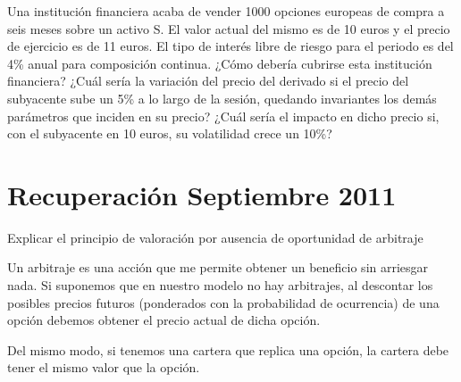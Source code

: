 \begin{problem}[4]
Una institución financiera acaba de vender 1000 opciones europeas de compra a seis meses sobre
un activo S. El valor actual del mismo es de 10 euros y el precio de ejercicio es de 11 euros. El tipo
de interés libre de riesgo para el periodo es del 4\% anual para composición continua.
\ppart ¿Cómo debería cubrirse esta institución financiera?
\ppart ¿Cuál sería la variación del precio del derivado si el precio del subyacente sube un 5\% a lo largo de la sesión, quedando invariantes los demás parámetros que inciden en su precio?
\ppart ¿Cuál sería el impacto en dicho precio si, con el subyacente en 10 euros, su volatilidad crece un 10\%?

\solution

\end{problem}

\section{Recuperación Septiembre 2011}
\begin{problem}[1]
Explicar el principio de valoración por ausencia de oportunidad de arbitraje
\solution


Un arbitraje es una acción que me permite obtener un beneficio sin arriesgar nada. Si suponemos que en nuestro modelo no hay arbitrajes, al descontar los posibles precios futuros (ponderados con la probabilidad de ocurrencia) de una opción debemos obtener el precio actual de dicha opción.

Del mismo modo, si tenemos una cartera que replica una opción, la cartera debe tener el mismo valor que la opción.
\end{problem}


